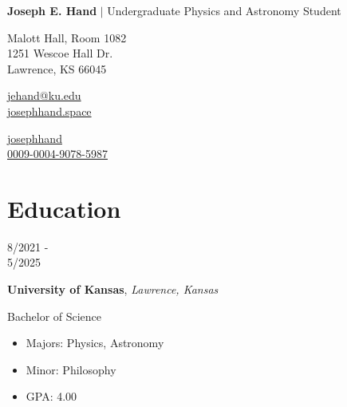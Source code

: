 \documentclass[12pt]{article}
\newcommand{\contactinfo}[3]{
    #1\hspace{6pt}\href{#2}{#3}\hspace{6pt}
}
\begin{document}
\setlength{\parindent}{0pt}

\thispagestyle{plain}

{\LARGE\textbf{Joseph E. Hand} $\vert$} Undergraduate Physics and Astronomy Student\bigskip

\begin{minipage}{\dimexpr\textwidth/3}
  Malott Hall, Room 1082\\
  1251 Wescoe Hall Dr.\\
  Lawrence, KS 66045
\end{minipage}
\begin{minipage}{\dimexpr\textwidth/3}
  \contactinfo{\faEnvelope}{mailto:jehand@ku.edu}{jehand@ku.edu}\\
  \contactinfo{\faGlobe}{https://josephhand.space}{josephhand.space}\\
\end{minipage}
\begin{minipage}{\dimexpr\textwidth/3}
  \contactinfo{\faGithub}{https://github.com/josephhand}{josephhand}\\
  \contactinfo{\aiOrcid}{https://orcid.org/0009-0004-9078-5987}{0009-0004-9078-5987}\\
\end{minipage}
\medskip


\newenvironment{education}[4]{
  \medskip
  \begin{minipage}[t]{0.75in}
    #3
  \end{minipage}
  \begin{minipage}[t]{\dimexpr\textwidth-0.75in}
    \textbf{#1}, \textit{#2}

    #4
    
    \smallskip
}{
  \end{minipage}
}

\vspace{-3ex}
\section*{Education}\vspace{-1ex}\vspace{-1ex}

\begin{education}{University of Kansas}{Lawrence, Kansas}{8/2021 -\\ 5/2025}{Bachelor of Science}
  \begin{itemize}
    \item Majors: Physics, Astronomy
    \item Minor: Philosophy
    \item GPA: 4.00
  \end{itemize}
\end{education}
\end{document}
